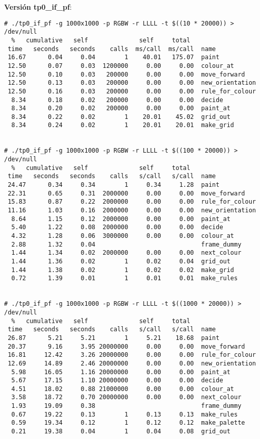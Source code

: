 \documentclass[a4paper, 10pt, twoside, notitlepage]{article}
\begin{document}
\textbf{Versión tp0\_if\_pf}:

\scriptsize
\begin{verbatim}
# ./tp0_if_pf -g 1000x1000 -p RGBW -r LLLL -t $((10 * 20000)) > /dev/null
  %   cumulative   self              self     total           
 time   seconds   seconds    calls  ms/call  ms/call  name    
 16.67      0.04     0.04        1    40.01   175.07  paint
 12.50      0.07     0.03  1200000     0.00     0.00  colour_at
 12.50      0.10     0.03   200000     0.00     0.00  move_forward
 12.50      0.13     0.03   200000     0.00     0.00  new_orientation
 12.50      0.16     0.03   200000     0.00     0.00  rule_for_colour
  8.34      0.18     0.02   200000     0.00     0.00  decide
  8.34      0.20     0.02   200000     0.00     0.00  paint_at
  8.34      0.22     0.02        1    20.01    45.02  grid_out
  8.34      0.24     0.02        1    20.01    20.01  make_grid


# ./tp0_if_pf -g 1000x1000 -p RGBW -r LLLL -t $((100 * 20000)) > /dev/null
  %   cumulative   self              self     total           
 time   seconds   seconds    calls   s/call   s/call  name    
 24.47      0.34     0.34        1     0.34     1.28  paint
 22.31      0.65     0.31  2000000     0.00     0.00  move_forward
 15.83      0.87     0.22  2000000     0.00     0.00  rule_for_colour
 11.16      1.03     0.16  2000000     0.00     0.00  new_orientation
  8.64      1.15     0.12  2000000     0.00     0.00  paint_at
  5.40      1.22     0.08  2000000     0.00     0.00  decide
  4.32      1.28     0.06  3000000     0.00     0.00  colour_at
  2.88      1.32     0.04                             frame_dummy
  1.44      1.34     0.02  2000000     0.00     0.00  next_colour
  1.44      1.36     0.02        1     0.02     0.04  grid_out
  1.44      1.38     0.02        1     0.02     0.02  make_grid
  0.72      1.39     0.01        1     0.01     0.01  make_rules


# ./tp0_if_pf -g 1000x1000 -p RGBW -r LLLL -t $((1000 * 20000)) > /dev/null
  %   cumulative   self              self     total           
 time   seconds   seconds    calls   s/call   s/call  name    
 26.87      5.21     5.21        1     5.21    18.68  paint
 20.37      9.16     3.95 20000000     0.00     0.00  move_forward
 16.81     12.42     3.26 20000000     0.00     0.00  rule_for_colour
 12.69     14.89     2.46 20000000     0.00     0.00  new_orientation
  5.98     16.05     1.16 20000000     0.00     0.00  paint_at
  5.67     17.15     1.10 20000000     0.00     0.00  decide
  4.51     18.02     0.88 21000000     0.00     0.00  colour_at
  3.58     18.72     0.70 20000000     0.00     0.00  next_colour
  1.93     19.09     0.38                             frame_dummy
  0.67     19.22     0.13        1     0.13     0.13  make_rules
  0.59     19.34     0.12        1     0.12     0.12  make_palette
  0.21     19.38     0.04        1     0.04     0.08  grid_out



\end{verbatim}
\end{document}
